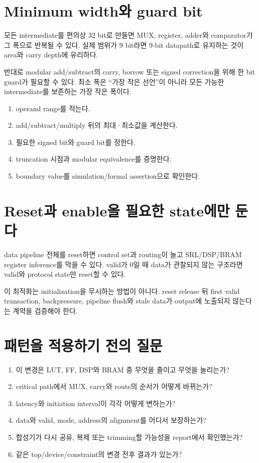 \section{Minimum width와 guard bit}

모든 intermediate를 편의상 32 bit로 만들면 MUX, register, adder와 comparator가
그 폭으로 반복될 수 있다. 실제 범위가 9 bit라면 9-bit datapath로 유지하는 것이
area와 carry depth에 유리하다.

반대로 modular add/subtract의 carry, borrow 또는 signed correction을 위해 한 bit
guard가 필요할 수 있다. 최소 폭은 ``가장 작은 선언''이 아니라 모든 가능한
intermediate를 보존하는 가장 작은 폭이다.

\begin{enumerate}
  \item operand range를 적는다.
  \item add/subtract/multiply 뒤의 최대·최소값을 계산한다.
  \item 필요한 signed bit와 guard bit를 정한다.
  \item truncation 시점과 modular equivalence를 증명한다.
  \item boundary value를 simulation/formal assertion으로 확인한다.
\end{enumerate}

\section{Reset과 enable을 필요한 state에만 둔다}

data pipeline 전체를 reset하면 control set과 routing이 늘고 SRL/DSP/BRAM register
inference를 막을 수 있다. valid가 0일 때 data가 관찰되지 않는 구조라면 valid와
protocol state만 reset할 수 있다.

이 최적화는 initialization을 무시하는 방법이 아니다. reset release 뒤 first
valid transaction, backpressure, pipeline flush와 stale data가 output에 노출되지
않는다는 계약을 검증해야 한다.

\section{패턴을 적용하기 전의 질문}

\begin{checklistbox}
\begin{enumerate}
  \item 이 변경은 LUT, FF, DSP와 BRAM 중 무엇을 줄이고 무엇을 늘리는가?
  \item critical path에서 MUX, carry와 route의 순서가 어떻게 바뀌는가?
  \item latency와 initiation interval이 각각 어떻게 변하는가?
  \item data와 valid, mode, address의 alignment를 어디서 보장하는가?
  \item 합성기가 다시 공유, 복제 또는 trimming할 가능성을 report에서 확인했는가?
  \item 같은 top/device/constraint의 변경 전후 결과가 있는가?
\end{enumerate}
\end{checklistbox}
